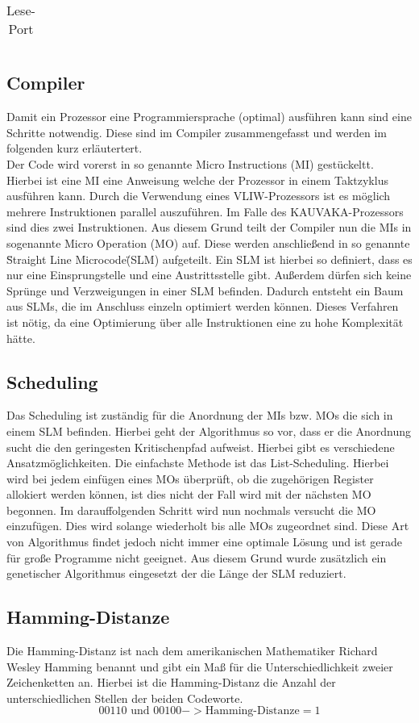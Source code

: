 \begin{table}[htbp]
\begin{minipage}{.4\textwidth}
\begin{tabular}{cccccccccccccccccc}
		\end{tabular}
		\caption{\label{lese-port}Lese-Port}
	\end{minipage}
\end{table}


\subsection{Compiler}
Damit ein Prozessor eine Programmiersprache (optimal) ausführen kann sind eine Schritte notwendig. Diese sind im Compiler zusammengefasst und werden im folgenden kurz erläutertert.\\
Der Code wird vorerst in so genannte Micro Instructions (MI) gestückeltt.  Hierbei ist eine MI eine Anweisung welche der Prozessor in einem Taktzyklus ausführen kann. Durch die Verwendung eines VLIW-Prozessors ist es möglich mehrere Instruktionen parallel auszuführen. Im Falle des KAUVAKA-Prozessors sind dies zwei Instruktionen. Aus diesem Grund teilt der Compiler nun die MIs in sogenannte Micro Operation (MO) auf. Diese werden anschließend in so genannte \"Straight Line Microcode\" (SLM) aufgeteilt. Ein SLM ist hierbei so definiert, dass es nur eine Einsprungstelle und eine Austrittsstelle gibt. Außerdem dürfen sich keine Sprünge und Verzweigungen in einer SLM befinden.  Dadurch entsteht ein Baum aus SLMs, die im Anschluss einzeln optimiert werden können. Dieses Verfahren ist nötig, da eine Optimierung über alle Instruktionen eine zu hohe Komplexität hätte. 
\subsection{Scheduling}
Das Scheduling ist zuständig für die Anordnung der MIs bzw. MOs die sich in einem SLM befinden. Hierbei geht der Algorithmus so vor, dass er die Anordnung sucht die den geringesten Kritischenpfad aufweist. Hierbei gibt es verschiedene Ansatzmöglichkeiten. Die einfachste Methode ist das List-Scheduling. Hierbei wird bei jedem einfügen eines MOs überprüft, ob die zugehörigen Register allokiert werden können, ist dies nicht der Fall wird mit der nächsten MO begonnen. Im darauffolgenden Schritt wird nun nochmals versucht die MO einzufügen. Dies wird solange wiederholt bis alle MOs zugeordnet sind.
Diese Art von Algorithmus findet jedoch nicht immer eine optimale Lösung und ist gerade für große Programme nicht geeignet. Aus diesem Grund wurde zusätzlich ein genetischer Algorithmus eingesetzt der die Länge der SLM reduziert.
\subsection{Hamming-Distanze}
Die Hamming-Distanz ist nach dem amerikanischen Mathematiker Richard Wesley Hamming benannt und gibt ein Maß für die Unterschiedlichkeit zweier Zeichenketten an. Hierbei ist die Hamming-Distanz die Anzahl der unterschiedlichen Stellen der beiden Codeworte.
\begin{equation}
	00110 \text{ und } 00100 -> \text{Hamming-Distanze}= 1
	\label{eq:hammingdistanze}
\end{equation}

